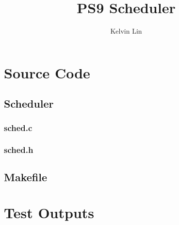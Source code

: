 \documentclass[12pt]{article}
\title{PS9 Scheduler}
\author{Kelvin Lin}
\begin{document}
\maketitle

\section{Source Code}

\subsection{Scheduler}

\subsubsection{sched.c}


\subsubsection{sched.h}


\subsection{Makefile}


\section {Test Outputs}

\end{document}
